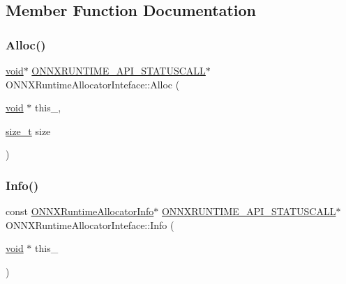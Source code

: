 \subsection{Member Function Documentation}
\mbox{\label{structONNXRuntimeAllocatorInteface_a87c198fd69b56c2623890b82ec888446}} 
\subsubsection{\texorpdfstring{Alloc()}{Alloc()}}
{\footnotesize\ttfamily \mbox{\hyperlink{structONNXRuntimeAllocatorInteface_a54eabf966f0201ca7ad1be93fcf5f133}{void}}$\ast$ \mbox{\hyperlink{error__code_8h_aeaeecdc9b792735c3e26fc0f9815c988}{O\+N\+N\+X\+R\+U\+N\+T\+I\+M\+E\+\_\+\+A\+P\+I\+\_\+\+S\+T\+A\+T\+U\+S\+C\+A\+LL}}$\ast$ O\+N\+N\+X\+Runtime\+Allocator\+Inteface\+::\+Alloc (\begin{DoxyParamCaption}\item[{\mbox{\hyperlink{structONNXRuntimeAllocatorInteface_a54eabf966f0201ca7ad1be93fcf5f133}{void}} $\ast$}]{this\+\_\+,  }\item[{\mbox{\hyperlink{mlasi_8h_a503efbc1c6e50825320ad909366b78ab}{size\+\_\+t}}}]{size }\end{DoxyParamCaption})}

\mbox{\label{structONNXRuntimeAllocatorInteface_a13c36d4c697ed0b81ef81e5998599fec}} 
\subsubsection{\texorpdfstring{Info()}{Info()}}
{\footnotesize\ttfamily const \mbox{\hyperlink{structONNXRuntimeAllocatorInfo}{O\+N\+N\+X\+Runtime\+Allocator\+Info}}$\ast$ \mbox{\hyperlink{error__code_8h_aeaeecdc9b792735c3e26fc0f9815c988}{O\+N\+N\+X\+R\+U\+N\+T\+I\+M\+E\+\_\+\+A\+P\+I\+\_\+\+S\+T\+A\+T\+U\+S\+C\+A\+LL}}$\ast$ O\+N\+N\+X\+Runtime\+Allocator\+Inteface\+::\+Info (\begin{DoxyParamCaption}\item[{\mbox{\hyperlink{structONNXRuntimeAllocatorInteface_a54eabf966f0201ca7ad1be93fcf5f133}{void}} $\ast$}]{this\+\_\+ }\end{DoxyParamCaption})}

